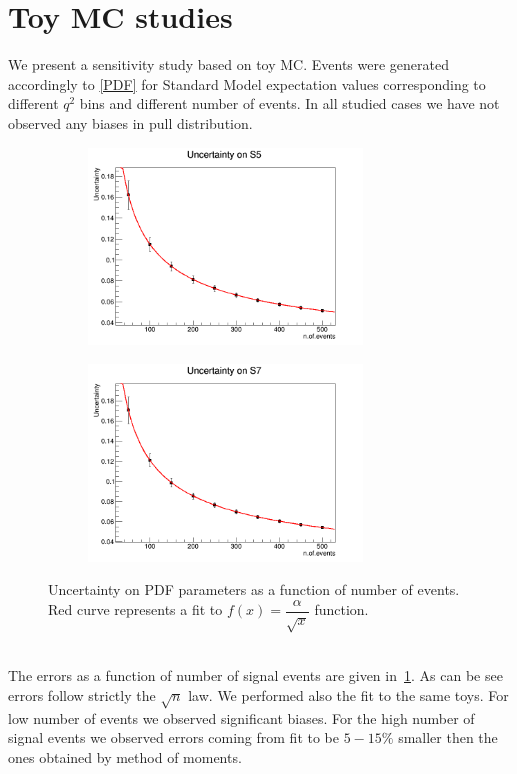 \documentclass[aps,prd,reprint,nofootinbib,preprintnumbers]{revtex4}
\begin{document}
\section{Toy MC studies}

We present a sensitivity study based on toy MC. Events were generated accordingly to \ref{PDF} for Standard Model expectation values corresponding to different $q^2$ bins and different number of events. In all studied cases we have not observed any biases in pull distribution. 
\begin{figure}[h]
        \centering
        \begin{subfigure}[b]{0.45\textwidth}
                \includegraphics[width=0.8\textwidth]{figs/Q2_5_6_S5.png}
                 \end{subfigure}
        \begin{subfigure}[b]{0.45\textwidth}
                \includegraphics[width=0.8\textwidth]{figs/Q2_5_6_S7.png}
                 \end{subfigure}
       \caption{Uncertainty on PDF parameters as a function of number of events. Red curve represents a fit to $f(x)=\dfrac{\alpha}{\sqrt{x}}$ function.}
        \label{errors}
\end{figure}\\
The errors as a function of number of signal events are given in~\ref{errors}. As can be see errors follow strictly the $\sqrt{n}$ law. We performed also the fit to the same toys. For low number of events we observed significant biases. For the high number of signal events we observed  errors coming from fit to be $5-15\%$ smaller then  the ones obtained by method of moments. 



\end{document}
